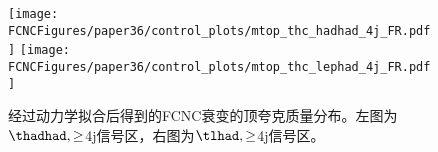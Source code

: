 
\begin{figure}[htb]
\centering
\texttt{[image: \\FCNCFigures/paper36/control\_plots/mtop\_thc\_hadhad\_4j\_FR.pdf]}
\texttt{[image: \\FCNCFigures/paper36/control\_plots/mtop\_thc\_lephad\_4j\_FR.pdf]}
\caption{经过动力学拟合后得到的FCNC衰变的顶夸克质量分布。左图为$\thadhad,\ge$4j信号区，右图为$\tlhad,\ge$4j信号区。}
\label{fig:topmass36}
\end{figure}